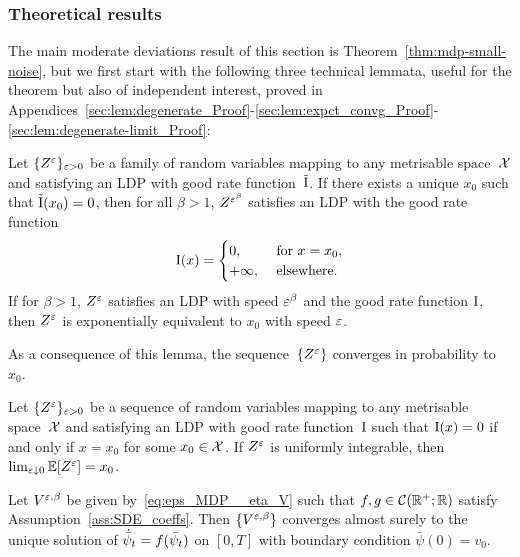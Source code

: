 \subsubsection{Theoretical results}
The main moderate deviations result of this section is Theorem~\ref{thm:mdp-small-noise}, 
but we first start with the following three technical lemmata,
useful for the theorem but also of independent interest, proved in Appendices~\ref{sec:lem:degenerate_Proof}-\ref{sec:lem:expct_convg_Proof}-\ref{sec:lem:degenerate-limit_Proof}:
\begin{lemma}\label{lem:degenerate}
Let $\{Z^{\varepsilon}\}_{\varepsilon>0}$ be a family of random variables mapping to any metrisable space~$\mathcal{X}$ and satisfying an LDP with good rate function~$\tilde{\mathrm{I}}$.
If there exists a unique $x_0$ such that $\tilde{\mathrm{I}}(x_0) = 0$, 
then for all $\beta > 1$, $Z^{\varepsilon^\beta}$ satisfies an LDP with the good rate function
\[ 
\mathrm{I}(x)=
\begin{cases} 
      0, & \text{ for } x=x_0, \\
      +\infty, & \text{ elsewhere.}
\end{cases}
\]
If for $\beta > 1$, $Z^{\varepsilon}$ satisfies an LDP with speed $\varepsilon^{\beta}$ and the good rate function $\mathrm{I}$, then $Z^{\varepsilon}$ is exponentially equivalent to $x_0$ with speed $\varepsilon$.
\end{lemma}

As a consequence of this lemma, the sequence~$\{Z^{\varepsilon}\}$ converges in probability to~$x_0$. 

\begin{lemma}\label{lem:expct_convg}
Let $\{Z^{\varepsilon}\}_{\varepsilon>0}$ be a sequence of random variables mapping to any metrisable space~$\mathcal{X}$ and satisfying an LDP with good rate function~$\mathrm{I}$ such that $\mathrm{I}(x)=0$ if and only if $x = x_0$ for some $x_0 \in\mathcal{X}$. 
If $Z^{\varepsilon}$ is uniformly integrable, then $\lim_{\varepsilon\downarrow 0}\mathbb{E}[Z^{\varepsilon}] = x_0$.
\end{lemma}

\begin{lemma}\label{lem:degenerate-limit}
Let $V^{\varepsilon,\beta}$ be given by~\eqref{eq:eps_MDP__eta_V} such that $f, g\in\mathcal{C}(\mathbb{R}^+; \mathbb{R})$  satisfy Assumption~\ref{ass:SDE_coeffs}. Then $\{V^{\varepsilon,\beta}\}$ converges almost surely to the unique solution of $\dot{\bar\psi}_t =\nobreak f(\bar\psi_t)$ on $[0,T]$ with boundary condition $\bar\psi(0) = v_0$.
\end{lemma}


